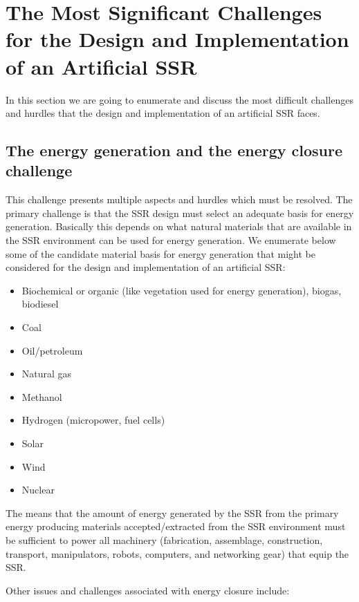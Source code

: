 \section[The Most Significant Challenges]{The Most Significant Challenges for the Design and Implementation of an Artificial SSR}

In this section we are going to enumerate and discuss the most difficult
challenges and hurdles that the design and implementation of an
artificial SSR faces.

\subsection[The energy generation and the energy closure challenge]{The
energy generation and the energy closure challenge}

This challenge presents multiple
aspects and hurdles which must be resolved.  
The primary challenge is that the SSR design must select an adequate basis for energy generation.
Basically this depends on what natural materials that are available in
the SSR environment can be used for energy generation.  
We enumerate below some of the candidate material basis for energy
generation that might be considered for the design and implementation
of an artificial SSR:

\begin{itemize}
\item Biochemical or organic (like vegetation used for energy
generation), biogas, biodiesel
\item Coal
\item Oil/petroleum
\item Natural gas
\item Methanol
\item Hydrogen (micropower, fuel cells)
\item Solar
\item Wind
\item Nuclear
\end{itemize}

The  means that the amount of
energy generated by the SSR from the primary energy producing materials
accepted/extracted from the SSR environment must be sufficient to power
all machinery (fabrication, assemblage, construction, transport,
manipulators, robots, computers, and networking gear) that equip the
SSR.

Other issues and challenges associated with energy closure include:

